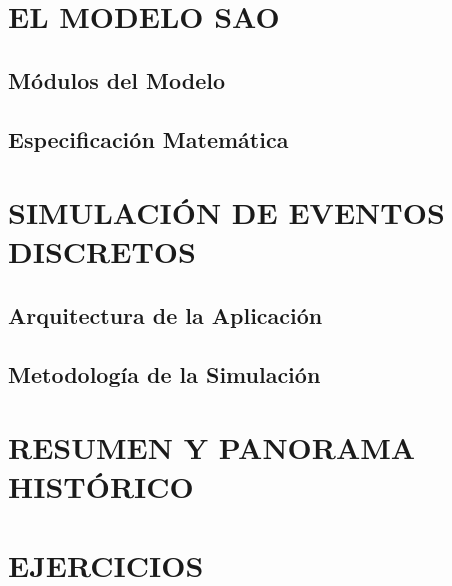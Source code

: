 \section{EL MODELO SAO}\label{sec:SAOModel}
\subsection{Módulos del Modelo}\label{subsec:ModulosdelModelo}
\subsection{Especificación Matemática}\label{subsec:EspecifMatem}

\section{SIMULACIÓN DE EVENTOS DISCRETOS}\label{sec:SimulEventDiscret}
\subsection{Arquitectura de la Aplicación }\label{subsec:ArquitDeLaApp}
\subsection{Metodología de la Simulación}\label{subsec:MetodDeLaSimul}

\section{RESUMEN Y PANORAMA HISTÓRICO }\label{sec:ResumenyPanHisoric}

\section{EJERCICIOS}\label{sec:EjerciciosModySimul}


